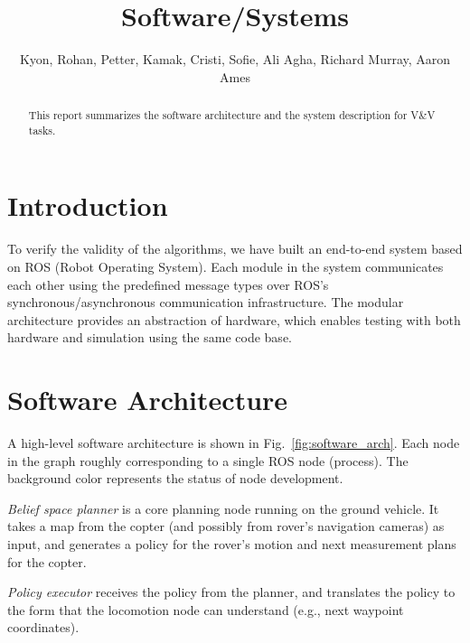 \documentclass[conference]{IEEEtran}
\begin{document}

\title{\huge Software/Systems}

\author{Kyon, Rohan, Petter, Kamak, Cristi, Sofie, Ali Agha, Richard Murray, Aaron Ames}

\maketitle

\begin{abstract}
This report summarizes the software architecture and the system description for V\&V tasks. 
\end{abstract}

\IEEEpeerreviewmaketitle

	
\section{Introduction} \label{subsec:intro}

To verify the validity of the algorithms, we have built an end-to-end system based on ROS (Robot Operating System). Each module in the system communicates each other using the predefined message types over ROS's synchronous/asynchronous communication infrastructure. The modular architecture provides an abstraction of hardware, which enables testing with both hardware and simulation using the same code base. 

\section{Software Architecture}

A high-level software architecture is shown in Fig.~\ref{fig:software_arch}. Each node in the graph roughly corresponding to a single ROS node (process). The background color represents the status of node development. 

\textit{Belief space planner} is a core planning node running on the ground vehicle. It takes a map from the copter (and possibly from rover's navigation cameras) as input, and generates a policy for the rover's motion and next measurement plans for the copter. 

\textit{Policy executor} receives the policy from the planner, and translates the policy to the form that the locomotion node can understand (e.g., next waypoint coordinates).
\end{document}
